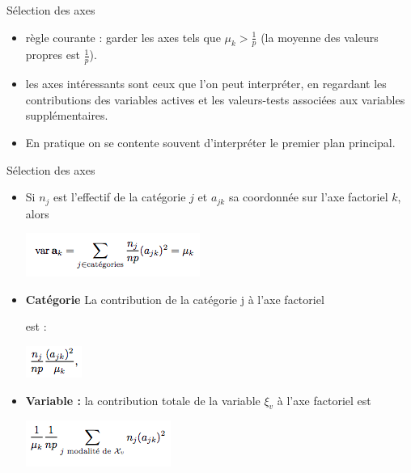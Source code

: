 \documentclass[10pt]{beamer}
\begin{document}

\begin{frame}{ Sélection des axes }
 
 \begin{itemize}
 \item  règle courante : garder les axes tels que $\mu_k > \frac{1}{p}$ (la moyenne des valeurs propres est $\frac{1}{p}$).
 \item  les axes intéressants sont ceux que l'on peut interpréter,
en regardant les contributions des variables actives et les valeurs-tests associées aux variables supplémentaires.
 \item En pratique on se contente souvent d’interpréter le
premier plan principal.
 \end{itemize}
 
 
\end{frame}




\begin{frame}{ Sélection des axes }
 
 \begin{itemize}
 \item   Si $n_j$ est l’effectif de la catégorie $j$ et $a_{jk}$ sa coordonnée sur l’axe factoriel $k$, alors

\centering  
  
 \includegraphics[scale=0.7]{AFC9} 
 
 
 \item  \textbf{Catégorie} La contribution de la catégorie j à l’axe factoriel

est : 

\centering 

 \includegraphics[scale=0.7]{AFC10} 
 
 \item  \textbf{Variable :} la contribution totale de la variable $\xi_v$ à l'axe factoriel est 
 
  \includegraphics[scale=0.7]{AFC11} 
  
   
 \end{itemize}
 
 
\end{frame}
\end{document}
